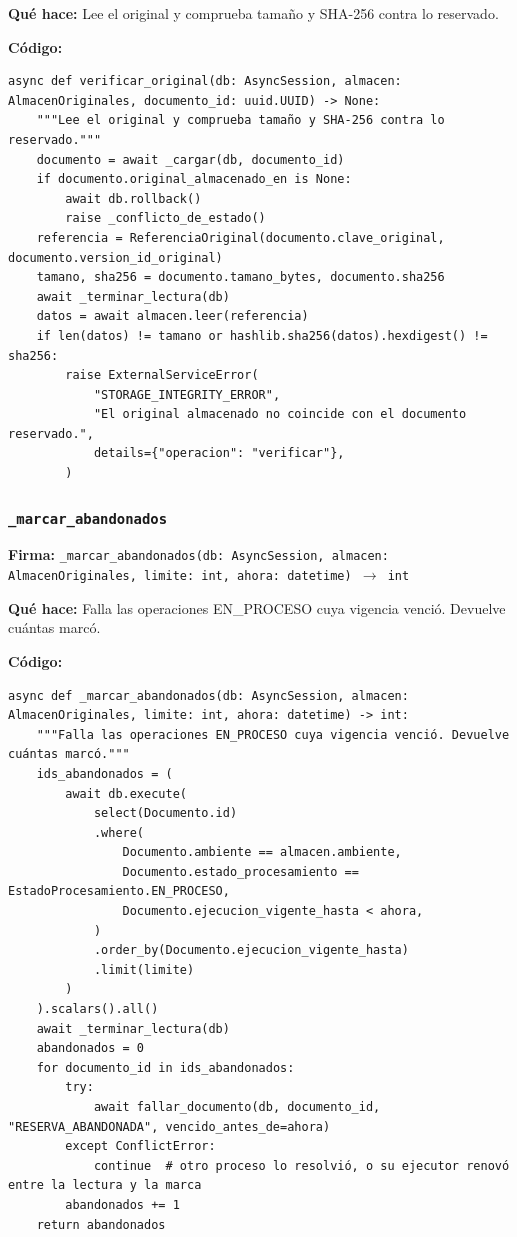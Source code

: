 \documentclass[11pt,a4paper]{article}
\begin{document}
\textbf{Qué hace:} Lee el original y comprueba tamaño y SHA-256 contra lo reservado.

\textbf{Código:}
\begin{lstlisting}
async def verificar_original(db: AsyncSession, almacen: AlmacenOriginales, documento_id: uuid.UUID) -> None:
    """Lee el original y comprueba tamaño y SHA-256 contra lo reservado."""
    documento = await _cargar(db, documento_id)
    if documento.original_almacenado_en is None:
        await db.rollback()
        raise _conflicto_de_estado()
    referencia = ReferenciaOriginal(documento.clave_original, documento.version_id_original)
    tamano, sha256 = documento.tamano_bytes, documento.sha256
    await _terminar_lectura(db)
    datos = await almacen.leer(referencia)
    if len(datos) != tamano or hashlib.sha256(datos).hexdigest() != sha256:
        raise ExternalServiceError(
            "STORAGE_INTEGRITY_ERROR",
            "El original almacenado no coincide con el documento reservado.",
            details={"operacion": "verificar"},
        )
\end{lstlisting}

\subsubsection*{\texttt{\_marcar\_abandonados}}
\textbf{Firma:} \texttt{\_marcar\_abandonados(db: AsyncSession, almacen: AlmacenOriginales, limite: int, ahora: datetime) $\rightarrow$ int}

\textbf{Qué hace:} Falla las operaciones EN\_PROCESO cuya vigencia venció. Devuelve cuántas marcó.

\textbf{Código:}
\begin{lstlisting}
async def _marcar_abandonados(db: AsyncSession, almacen: AlmacenOriginales, limite: int, ahora: datetime) -> int:
    """Falla las operaciones EN_PROCESO cuya vigencia venció. Devuelve cuántas marcó."""
    ids_abandonados = (
        await db.execute(
            select(Documento.id)
            .where(
                Documento.ambiente == almacen.ambiente,
                Documento.estado_procesamiento == EstadoProcesamiento.EN_PROCESO,
                Documento.ejecucion_vigente_hasta < ahora,
            )
            .order_by(Documento.ejecucion_vigente_hasta)
            .limit(limite)
        )
    ).scalars().all()
    await _terminar_lectura(db)
    abandonados = 0
    for documento_id in ids_abandonados:
        try:
            await fallar_documento(db, documento_id, "RESERVA_ABANDONADA", vencido_antes_de=ahora)
        except ConflictError:
            continue  # otro proceso lo resolvió, o su ejecutor renovó entre la lectura y la marca
        abandonados += 1
    return abandonados
\end{lstlisting}
\end{document}
